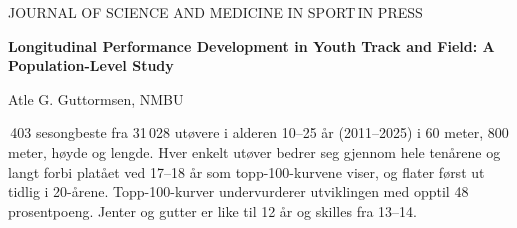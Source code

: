 \newcommand{\forskning}[5]{\begin{tcolorbox}[forsk]
  {\kickfont\footnotesize\color{aksent}\MakeUppercase{#1}}\hfill{\kickfont\footnotesize\color{white}\colorbox{hovedbla}{\,\MakeUppercase{#2}\,}}\par\vspace{5pt}
  {\RaggedRight\sffamily\bfseries\fontsize{10.5}{12.6}\selectfont\color{morkgra}#3\par}\vspace{3pt}
  {\RaggedRight\sffamily\footnotesize\color{hovedbla}#4\par}\vspace{6pt}
  {\setlength{\parindent}{0pt}\RaggedRight\fontsize{8.6}{10.8}\selectfont\linespread{1}\selectfont #5\par}
\end{tcolorbox}}

\gdef\arttag{forskere}
\makeatletter
{}
\makeatother

\forskning{Journal of Science and Medicine in Sport}{In press}
  {Longitudinal Performance Development in Youth Track and Field: A Population-Level Study}
  {Atle G. Guttormsen, NMBU}
  {135\,403 sesongbeste fra 31\,028 utøvere i alderen 10–25 år (2011–2025) i 60 meter, 800 meter, høyde og lengde. Hver enkelt utøver bedrer seg gjennom hele tenårene og langt forbi platået ved 17–18 år som topp-100-kurvene viser, og flater først ut tidlig i 20-årene. Topp-100-kurver undervurderer utviklingen med opptil 48 prosentpoeng. Jenter og gutter er like til 12 år og skilles fra 13–14.}

